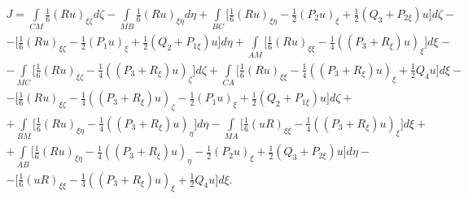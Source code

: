 \begin{gather*}


J=\int\limits_{CM} \frac{1}{6} (Ru)_{\xi\zeta} d\zeta


-\int\limits_{MB} \frac{1}{6} (Ru)_{\xi\eta} d\eta +


\int\limits_{BC}


\bigg[ \frac{1}{6} (Ru)_{\xi\eta}-\frac{1}{2} (P_2 u)_\xi


+\frac{1}{2} (Q_3+P_{2\xi})u \bigg] d\zeta -\\


%


-\bigg[ \frac{1}{6} (Ru)_{\xi\zeta}-\frac{1}{2} (P_1 u)_\xi


+\frac{1}{2} (Q_2+P_{1\xi})u \bigg] d\eta +


\int\limits_{AM}


\bigg[\frac{1}{6}(Ru)_{\xi\xi}-\frac{1}{4} ((P_3 +R_\xi)u)_\xi \bigg] d\xi-\\


%


-\int\limits_{MC}


\bigg[ \frac{1}{6} (Ru)_{\xi\zeta}-\frac{1}{4}


((P_3 +R_\xi)u)_\zeta \bigg] d\zeta +


\int\limits_{CA}


\bigg[ \frac{1}{6} (Ru)_{\xi\xi}-\frac{1}{4}


((P_3 +R_\xi)u)_\xi +\frac{1}{2} Q_4 u


\bigg] d\xi -\\


%


-\bigg[ \frac{1}{6} (Ru)_{\xi\zeta}-\frac{1}{4}


((P_3 +R_\xi)u)_\zeta -\frac{1}{2}


(P_1 u)_\xi +\frac{1}{2} (Q_2+P_{1\xi})u \bigg] d\zeta + \\


%


+\int\limits_{BM} \bigg[


\frac{1}{6} (Ru)_{\xi\eta}-\frac{1}{4} ((P_3 +R_\xi)u)_\eta \bigg] d\eta-


\int\limits_{MA}


\bigg[ \frac{1}{6} (uR)_{\xi\xi} -\frac{1}{4}


((P_3 +R_\xi)u)_\xi \bigg] d\xi + \\


%


+\int\limits_{AB} \bigg[


\frac{1}{6} (Ru)_{\xi\eta}-\frac{1}{4}


((P_3 +R_\xi)u)_\eta -\frac{1}{2} (P_2 u)_\xi


+\frac{1}{2} (Q_3 +P_{2\xi})u \bigg] d\eta - \\


%


-\bigg[ \frac{1}{6} (uR)_{\xi\xi} -\frac{1}{4}


((P_3 +R_\xi)u)_\xi +\frac{1}{2} Q_4 u\bigg] d\xi.


\end{gather*}


